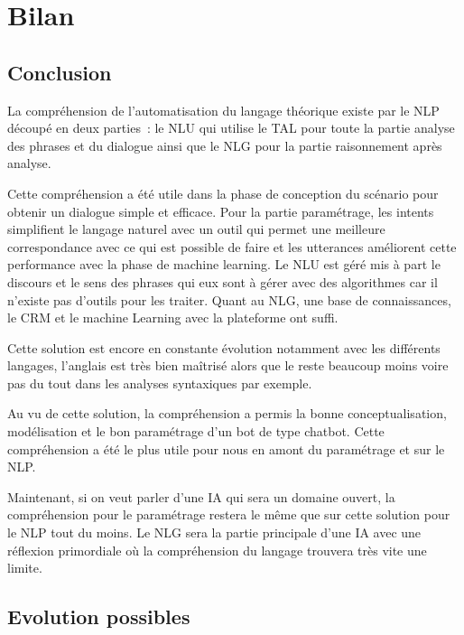 \chapter{Bilan}


\section{Conclusion}

La compréhension de l’automatisation du langage théorique existe par le NLP découpé en deux parties :  le NLU qui utilise le TAL pour toute la partie analyse des phrases et du dialogue ainsi que le NLG pour la partie raisonnement après analyse. 
\vspace{1em}

Cette compréhension a été utile dans la phase de conception du scénario pour obtenir un dialogue simple et efficace. Pour la partie paramétrage, les intents simplifient  le langage naturel avec un outil qui permet une meilleure correspondance avec ce qui est possible de faire et les utterances améliorent cette performance avec la phase de machine learning. Le NLU est géré mis à part le discours et le sens des phrases qui eux sont à gérer avec des algorithmes car il n’existe pas d’outils pour les traiter. Quant au NLG, une base de connaissances, le CRM et le machine Learning avec la plateforme ont suffi.
\vspace{1em}

Cette solution est encore en constante évolution notamment avec les différents langages, l’anglais est très bien maîtrisé alors que le reste beaucoup moins voire pas du tout dans les analyses syntaxiques par exemple.
\vspace{1em}

Au vu de cette solution, la compréhension a permis la bonne conceptualisation, modélisation et le bon paramétrage d’un bot de type chatbot. Cette compréhension a été le plus utile pour nous en amont du paramétrage et sur le NLP.
\vspace{1em}

Maintenant, si on veut parler d’une IA qui sera un domaine ouvert,  la compréhension pour le paramétrage restera le même que sur cette solution pour le NLP tout du moins. Le NLG sera la partie principale d’une IA avec une réflexion primordiale où la compréhension du langage trouvera très vite une limite.

\section{Evolution possibles}

